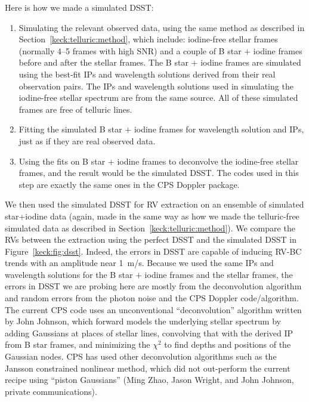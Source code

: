 Here is how we made a simulated DSST:
\begin{enumerate}
  \item Simulating the relevant observed data, using the same method
    as described in Section~\ref{keck:telluric:method}, which include:
    iodine-free stellar frames (normally 4--5 frames with high SNR) and a
    couple of B star $+$ iodine frames before and after the stellar
    frames. The B star $+$ iodine frames are simulated using the best-fit
    IPs and wavelength solutions derived from their real observation
    pairs. The IPs and wavelength solutions used in simulating the
    iodine-free stellar spectrum are from the same source. All of these
    simulated frames are free of telluric lines.
  \item Fitting the simulated B star $+$ iodine frames for wavelength
    solution and IPs, just as if they are real observed data.
  \item Using the fits on B star $+$ iodine frames to deconvolve the
    iodine-free stellar frames, and the result would be the simulated
    DSST. The codes used in this step are exactly the same ones in the
    CPS Doppler package.
\end{enumerate}

We then used the simulated DSST for RV extraction on an ensemble of
simulated star$+$iodine data (again, made in the same way as how we
made the telluric-free simulated data as described in
Section~\ref{keck:telluric:method}). We compare the RVs between the
extraction using the perfect DSST and the simulated DSST in
Figure~\ref{keck:fig:dsst}. Indeed, the errors in DSST are capable of
inducing RV-BC trends with an amplitude near 1~m/s. Because we used
the same IPs and wavelength solutions for the B star $+$ iodine frames
and the stellar frames, the errors in DSST we are probing here are
mostly from the deconvolution algorithm and random errors from the
photon noise and the CPS Doppler code/algorithm. The current CPS code
uses an unconventional ``deconvolution'' algorithm written by John
Johnson, which forward models the underlying stellar spectrum by
adding Gaussians at places of stellar lines, convolving that
with the derived IP from B star frames, and minimizing the $\chi^2$ to
find depths and positions of the Gaussian nodes. CPS has used other
deconvolution algorithms such as the Jansson constrained nonlinear
method, which did not out-perform the current recipe using ``piston
Gaussians'' (Ming Zhao, Jason Wright, and John Johnson, private
communications). 

